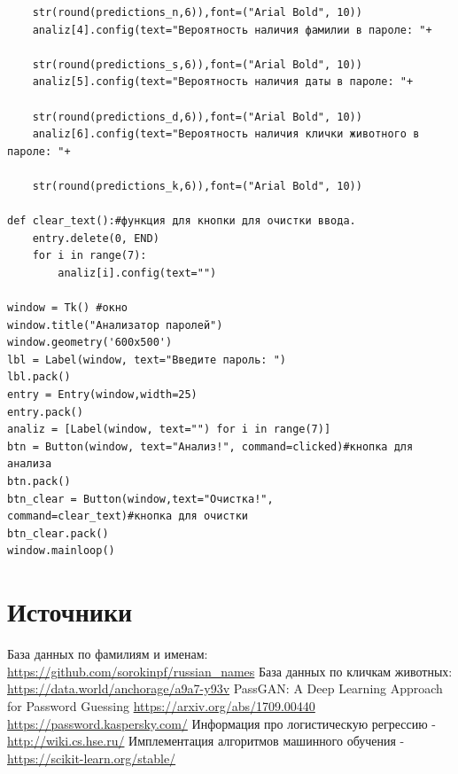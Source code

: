 \documentclass[a4paper,12pt]{article}
\begin{document}
\begin{verbatim}
    str(round(predictions_n,6)),font=("Arial Bold", 10))
    analiz[4].config(text="Вероятность наличия фамилии в пароле: "+
    
    str(round(predictions_s,6)),font=("Arial Bold", 10))
    analiz[5].config(text="Вероятность наличия даты в пароле: "+
    
    str(round(predictions_d,6)),font=("Arial Bold", 10))
    analiz[6].config(text="Вероятность наличия клички животного в пароле: "+
    
    str(round(predictions_k,6)),font=("Arial Bold", 10))

def clear_text():#функция для кнопки для очистки ввода.
    entry.delete(0, END)
    for i in range(7):
        analiz[i].config(text="")

window = Tk() #окно
window.title("Анализатор паролей")  
window.geometry('600x500')  
lbl = Label(window, text="Введите пароль: ")  
lbl.pack()
entry = Entry(window,width=25)  
entry.pack()
analiz = [Label(window, text="") for i in range(7)]
btn = Button(window, text="Анализ!", command=clicked)#кнопка для анализа 
btn.pack()
btn_clear = Button(window,text="Очистка!", 
command=clear_text)#кнопка для очистки
btn_clear.pack()
window.mainloop()
\end{verbatim}
\newpage
\section{Источники}
\renewcommand{\refname}{Список источников}
\begin{thebibliography}{99}
База данных по фамилиям и именам:
\href{https://github.com/sorokinpf/russian_names}{https://github.com/sorokinpf/russian_names}
База данных по кличкам животных:
\href{https://data.world/anchorage/a9a7-y93v}{https://data.world/anchorage/a9a7-y93v} 
PassGAN: A Deep Learning Approach for Password Guessing \href{https://arxiv.org/abs/1709.00440}{https://arxiv.org/abs/1709.00440} 
\href{https://password.kaspersky.com/}{https://password.kaspersky.com/} 
Информация про логистическую регрессию - 
\href{http://wiki.cs.hse.ru/}{http://wiki.cs.hse.ru/} 
Имплементация алгоритмов машинного обучения - 
\href{https://scikit-learn.org/stable/}{https://scikit-learn.org/stable/} 
\end{thebibliography}
\end{document}
